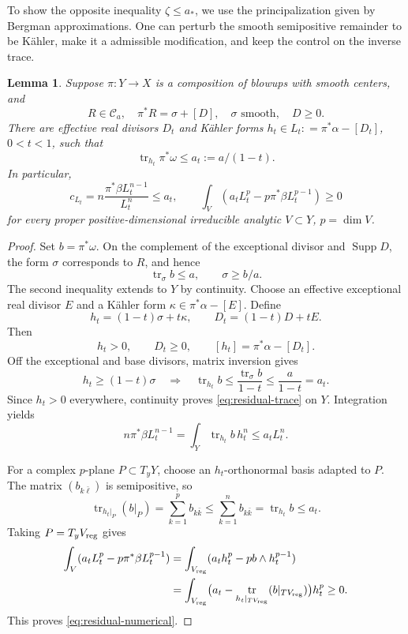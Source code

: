 \documentclass[reqno]{amsart}
\numberwithin{equation}{section}
\newtheorem{lemma}[theorem]{Lemma}
\theoremstyle{definition}
\DeclareMathOperator{\tr}{tr}
\begin{document}
To show the opposite inequality $\zeta\leq a_*$, we use the principalization given by Bergman approximations. One can perturb the smooth semipositive remainder to be K\"ahler, make it a admissible  modification, and keep the control on the inverse trace. 
\begin{lemma}\label{lem:residual-models}
Suppose $\pi:Y\to X$ is a composition of blowups with smooth centers, and
\[
R\in\mathcal C_a, \quad \pi^*R=\sigma+[D],\quad
\sigma\text{ smooth},\quad D\ge0.
\]
There are effective real divisors $D_t$ and K\"ahler forms $h_t\in L_t: =\pi^*\alpha-[D_t]$, $0<t<1$, such that
\begin{equation}\label{eq:residual-trace}
\tr_{h_t}\pi^*\omega\le a_t:=a/(1-t).
\end{equation}
In particular, 
\begin{equation}\label{eq:residual-numerical}
c_{L_t}=n\frac{\pi^*\beta L_t^{n-1}}{L_t^n}\le a_t,\qquad
\int_V(a_tL_t^p-p\pi^*\beta L_t^{p-1})\ge0
\end{equation}
for every proper positive-dimensional irreducible analytic $V\subset Y$, $p=\dim V$.
\end{lemma}
\begin{proof}
Set $b=\pi^*\omega$.
On the complement of the exceptional divisor and $\operatorname{Supp}D$,
the form $\sigma$ corresponds to $R$, and hence
\[
\tr_\sigma b\le a,\qquad \sigma\ge b/a.
\]
The second inequality extends to $Y$ by continuity.
 Choose an effective
exceptional real divisor $E$ and a K\"ahler form
$\kappa\in\pi^*\alpha-[E]$. Define
\begin{equation}\label{eq:residual-forms}
h_t=(1-t)\sigma+t\kappa,\qquad D_t=(1-t)D+tE.
\end{equation}
Then
\[
h_t>0,\qquad D_t\ge0,\qquad
[h_t]=\pi^*\alpha-[D_t].
\]
Off the exceptional and base divisors, matrix inversion gives
\[
h_t\ge(1-t)\sigma
\quad\Longrightarrow\quad
\tr_{h_t}b
\le\frac{\tr_\sigma b}{1-t}
\le\frac a{1-t}=a_t.
\]
Since $h_t>0$ everywhere, continuity proves
\eqref{eq:residual-trace} on $Y$.
Integration yields
\[
n\pi^*\beta L_t^{n-1}
=\int_Y\tr_{h_t}b\,h_t^n
\le a_tL_t^n.
\]

For a complex $p$-plane $P\subset T_yY$, choose an
$h_t$-orthonormal basis adapted to $P$.
The matrix $(b_{k\bar\ell})$ is semipositive, so
\[
\tr_{h_t|_P}(b|_P)
=\sum_{k=1}^p b_{k\bar k}
\le\sum_{k=1}^n b_{k\bar k}
=\tr_{h_t}b\le a_t.
\]
Taking $P=T_yV_{\rm reg}$ gives
\[
\begin{aligned}
\int_V(a_tL_t^p-p\pi^*\beta L_t^{p-1})
&=\int_{V_{\rm reg}}(a_th_t^p-pb\wedge h_t^{p-1})\\
&=\int_{V_{\rm reg}}
 \bigl(a_t-\tr_{h_t|_{TV_{\rm reg}}}
                   (b|_{TV_{\rm reg}})\bigr)h_t^p
\ge0.
\end{aligned}
\]
This proves \eqref{eq:residual-numerical}.
\end{proof}
\end{document}

